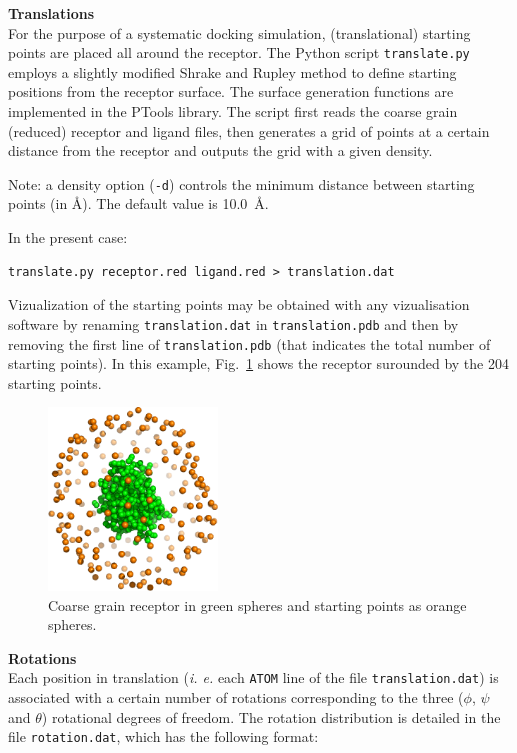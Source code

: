 \documentclass[12pt,a4paper]{article}
\begin{document}
\textbf{Translations}\\
For the purpose of a systematic docking simulation, (translational) 
starting points are placed  all around the
receptor. The Python script {\tt translate.py} employs a slightly modified
Shrake and Rupley \cite{Shrake1973} method to define starting positions
from the receptor surface. The surface generation functions are implemented in
the PTools library. The script first reads the coarse grain (reduced)
receptor and ligand files, then generates a grid of points at a certain
distance from the receptor and outputs the grid with a given density.

Note: a density option ({\tt -d}) controls the minimum distance between starting
points (in \AA). The default value is 10.0~\AA. 

In the present case:
\begin{verbatim}
translate.py receptor.red ligand.red > translation.dat
\end{verbatim}

Vizualization of the starting points may be obtained with any vizualisation 
software by renaming {\tt translation.dat} in {\tt translation.pdb} and then
by removing the first line of {\tt translation.pdb} (that indicates the total 
number of starting points). In this example, Fig.~\ref{1CGI_translation} shows
the receptor surounded by the 204 starting points.

\begin{figure}[htbp]
\center
\includegraphics*[width=0.4\textwidth]{img/1CGI_translation.png}
\caption{Coarse grain receptor in green spheres and starting points as orange spheres.}
\label{1CGI_translation}
\end{figure}

\textbf{Rotations}\\
Each position in translation (\textit{i. e.} each {\tt ATOM} line of the file {\tt translation.dat})
is associated with a certain number of rotations corresponding to the three ($\phi$, $\psi$ and $\theta$) 
rotational degrees of freedom. The rotation distribution is detailed in the file {\tt rotation.dat},
which has the following format:
\end{document}
